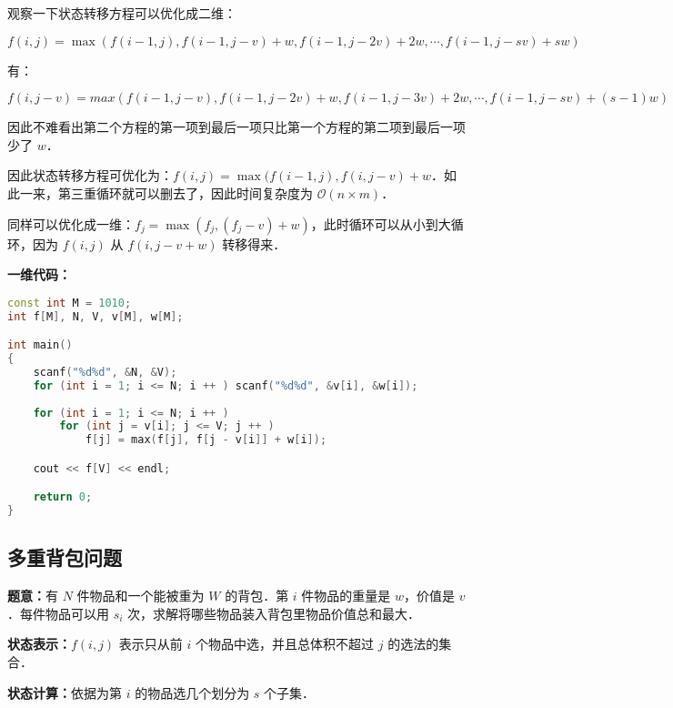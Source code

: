 观察一下状态转移方程可以优化成二维：

\begin{equation}
f(i, j) = \max(f(i - 1, j), f(i - 1, j - v) + w, f(i - 1, j - 2v) + 2w , \cdots , f(i - 1, j - sv) + sw)
\end{equation}

有：

\begin{equation}
f(i, j - v) = max(f(i - 1, j - v), f(i - 1, j - 2v) + w, f(i - 1, j - 3v) + 2w , \cdots, f(i - 1, j - sv) + (s - 1)w)
\end{equation}

因此不难看出第二个方程的第一项到最后一项只比第一个方程的第二项到最后一项少了 $w$．

因此状态转移方程可优化为：$f(i, j) = \max(f(i - 1, j), f(i, j - v) + w$．如此一来，第三重循环就可以删去了，因此时间复杂度为 $\mathcal{O}(n \times m)$．

同样可以优化成一维：$f_j = \max(f_j, (f_j - v) + w)$，此时循环可以从小到大循环，因为 $f(i, j)$ 从 $f(i, j - v + w)$ 转移得来．

\textbf{一维代码：}

\begin{lstlisting}[language=cpp]
const int M = 1010;
int f[M], N, V, v[M], w[M];

int main()
{
    scanf("%d%d", &N, &V);
    for (int i = 1; i <= N; i ++ ) scanf("%d%d", &v[i], &w[i]);
    
    for (int i = 1; i <= N; i ++ ) 
        for (int j = v[i]; j <= V; j ++ ) 
            f[j] = max(f[j], f[j - v[i]] + w[i]);

    cout << f[V] << endl;

    return 0;
}
\end{lstlisting}

\subsection{多重背包问题}

\textbf{题意：}有 $N$ 件物品和一个能被重为 $W$ 的背包．第 $i$ 件物品的重量是 $w$，价值是 $v$ ．每件物品可以用 $s_i$ 次，求解将哪些物品装入背包里物品价值总和最大．

\textbf{状态表示：}$f(i, j)$ 表示只从前 $i$ 个物品中选，并且总体积不超过 $j$ 的选法的集合．

\textbf{状态计算：}依据为第 $i$ 的物品选几个划分为 $s$ 个子集．

